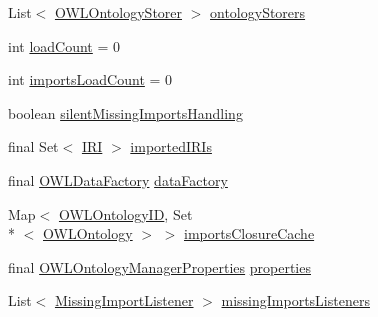 \begin{DoxyCompactItemize}
\item 
List$<$ \hyperlink{interfaceorg_1_1semanticweb_1_1owlapi_1_1model_1_1_o_w_l_ontology_storer}{O\-W\-L\-Ontology\-Storer} $>$ \hyperlink{classuk_1_1ac_1_1manchester_1_1cs_1_1owl_1_1owlapi_1_1_o_w_l_ontology_manager_impl_a8e6583aca43b9e1dab019fdc2b615345}{ontology\-Storers}
\item 
int \hyperlink{classuk_1_1ac_1_1manchester_1_1cs_1_1owl_1_1owlapi_1_1_o_w_l_ontology_manager_impl_a4cc09208bf8c7271f9010b5bb1e8212a}{load\-Count} = 0
\item 
int \hyperlink{classuk_1_1ac_1_1manchester_1_1cs_1_1owl_1_1owlapi_1_1_o_w_l_ontology_manager_impl_a03dec3e72d25a96fe65d78142f30a729}{imports\-Load\-Count} = 0
\item 
boolean \hyperlink{classuk_1_1ac_1_1manchester_1_1cs_1_1owl_1_1owlapi_1_1_o_w_l_ontology_manager_impl_a6c32b7411e99b98617e364a5782748f1}{silent\-Missing\-Imports\-Handling}
\item 
final Set$<$ \hyperlink{classorg_1_1semanticweb_1_1owlapi_1_1model_1_1_i_r_i}{I\-R\-I} $>$ \hyperlink{classuk_1_1ac_1_1manchester_1_1cs_1_1owl_1_1owlapi_1_1_o_w_l_ontology_manager_impl_ad4f70eb9dde576965c05ddff400afe3b}{imported\-I\-R\-Is}
\item 
final \hyperlink{interfaceorg_1_1semanticweb_1_1owlapi_1_1model_1_1_o_w_l_data_factory}{O\-W\-L\-Data\-Factory} \hyperlink{classuk_1_1ac_1_1manchester_1_1cs_1_1owl_1_1owlapi_1_1_o_w_l_ontology_manager_impl_a07c3c2f468a345a2020be1d5a4099848}{data\-Factory}
\item 
Map$<$ \hyperlink{classorg_1_1semanticweb_1_1owlapi_1_1model_1_1_o_w_l_ontology_i_d}{O\-W\-L\-Ontology\-I\-D}, Set\\*
$<$ \hyperlink{interfaceorg_1_1semanticweb_1_1owlapi_1_1model_1_1_o_w_l_ontology}{O\-W\-L\-Ontology} $>$ $>$ \hyperlink{classuk_1_1ac_1_1manchester_1_1cs_1_1owl_1_1owlapi_1_1_o_w_l_ontology_manager_impl_a19d4ca471c90e34f47745dd302735f02}{imports\-Closure\-Cache}
\item 
final \hyperlink{classorg_1_1semanticweb_1_1owlapi_1_1model_1_1_o_w_l_ontology_manager_properties}{O\-W\-L\-Ontology\-Manager\-Properties} \hyperlink{classuk_1_1ac_1_1manchester_1_1cs_1_1owl_1_1owlapi_1_1_o_w_l_ontology_manager_impl_a85558a144f2d2a02d1c85ddfcaa72def}{properties}
\item 
List$<$ \hyperlink{interfaceorg_1_1semanticweb_1_1owlapi_1_1model_1_1_missing_import_listener}{Missing\-Import\-Listener} $>$ \hyperlink{classuk_1_1ac_1_1manchester_1_1cs_1_1owl_1_1owlapi_1_1_o_w_l_ontology_manager_impl_a242f835c036f54a6d0bd187a242c7ee4}{missing\-Imports\-Listeners}

\end{DoxyCompactItemize}
